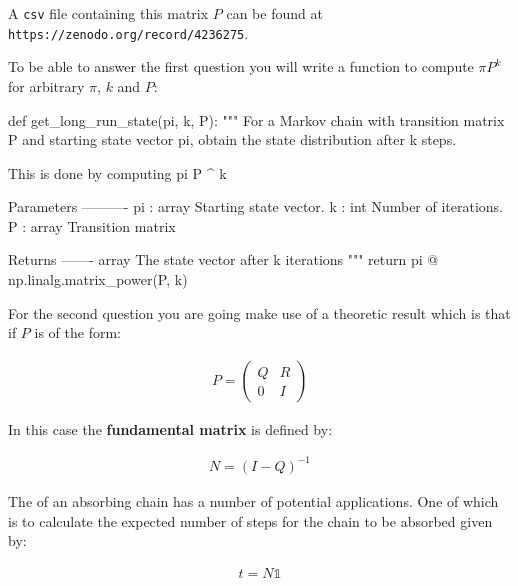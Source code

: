 A \texttt{csv} file containing this matrix \(P\) can be found at
\texttt{https://zenodo.org/record/4236275}.


To be able to answer the first question you will write a function to compute \(\pi
P ^ k\) for arbitrary \(\pi\), \(k\) and \(P\):

\begin{python}
def get_long_run_state(pi, k, P):
    """
    For a Markov chain with transition matrix P and starting state vector pi,
    obtain the state distribution after k steps.

    This is done by computing pi P ^ k

    Parameters
    ----------
    pi : array
        Starting state vector.
    k : int
        Number of iterations.
    P : array
        Transition matrix

    Returns
    -------
    array
        The state vector after k iterations
    """
    return pi @ np.linalg.matrix_power(P, k)
\end{python}





For the second question you are going make use of a theoretic result which is
that if \(P\) is of the form:

\begin{equation*}
\begin{split}
P = \begin{pmatrix}
        Q & R \\
        0 & I
    \end{pmatrix}
\end{split}
\end{equation*}

In this case the \textbf{fundamental matrix} is defined by:

\begin{equation*}
\begin{split}
    N = (I - Q) ^ {- 1}
\end{split}
\end{equation*}

The  of an absorbing  chain has a number of potential
applications. One of which is to calculate
the expected number of steps for the  chain to be absorbed given by:

\begin{equation*}
\begin{split}
    t = N\mathbb{1}
\end{split}
\end{equation*}

